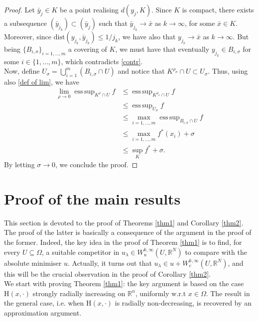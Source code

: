 \documentclass[a4paper,11pt]{article}
\numberwithin{equation}{section}
\newcommand{\numberset}{\mathbb}
\newcommand{\Om}{\Omega}
\newcommand{\R}{\numberset{R}}
\newcommand{\rom}{\mathrm}
\DeclareMathOperator*{\esssup}{ess\,sup}
\theoremstyle{definition}
\begin{document}
\begin{proof}
 Let $\bar y_j\in K$ be a point realising $d(y_j,K)$. Since $K$ is compact, there exists a subsequence $(\bar y_{j_k})\subset(\bar y_j)$ such that $\bar y_{j_k}\to \bar x$ as $k\to\infty$, for some $\bar x\in K$. Moreover, since $\mathrm{dist}(y_{j_k},\bar y_{j_k})\leq1/{j_k}$, we have also that $y_{j_k}\to \bar x$ as $k\to\infty$. But being $\{B_{i,\sigma}\}_{i=1,\ldots,m}$ a covering of $K$, we must have that eventually $y_{j_k}\in B_{i,\sigma}$ for some $i\in\{1,\ldots,m\}$, which contradicts \eqref{contr}.\\
Now, define $U_\sigma=\bigcup_{i=1}^m (B_{i,\sigma}\cap U)$ and notice that ${K^{\rho_\sigma}\cap U}\subset U_\sigma$. Thus, using also \eqref{def of lim}, we have
\begin{align*}
\lim_{\rho\to0}\esssup_{K^\rho\cap U}f&\leq\esssup_{K^{\rho_\sigma}\cap U}f\\
&\leq \esssup_{U_\sigma}f\\
&\leq\max_{i=1,\ldots,m}\esssup_{B_{i,\sigma}\cap U}f\\
&\leq\max_{i=1,\ldots,m} f^*(x_i)+\sigma\\
&\leq\sup_K f^*+\sigma.
\end{align*}
By letting $\sigma\to0$, we conclude the proof.
\end{proof}





\section{Proof of the main results}\label{sec:proofs}
This section is devoted to the proof of Theorems \ref{thm1} and Corollary \ref{thm2}. The proof of the latter is basically a consequence of the argument in the proof of the former. Indeed, the key idea in the proof of Theorem \ref{thm1} is to find, for every $U\subseteq\Om$, a suitable competitor in $u_\lambda\in W^{k,\infty}_u(U,\R^N)$ to compare with the absolute minimiser $u$. Actually, it turns out that $u_\lambda\in u+W^{k,\infty}_c(U,\R^N)$, and this will be the crucial observation in the proof of Corollary \ref{thm2}.\\
We start with proving Theorem \ref{thm1}: the key argument is based on the case $\rom{H}(x,\cdot)$ strongly radially increasing on $\R^\alpha$, uniformly w.r.t $x\in \Omega$. The result in the general case, i.e. when $\rom{H}(x,\cdot)$ is radially non-decreasing, is recovered by an approximation argument.\\
\end{document}
